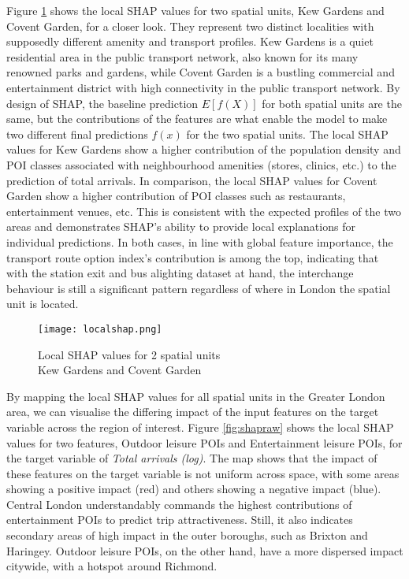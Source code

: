 Figure \ref{fig:localshap} shows the local SHAP values for two spatial units, Kew Gardens and Covent Garden, for a closer look. They represent two distinct localities with supposedly different amenity and transport profiles. Kew Gardens is a quiet residential area in the public transport network, also known for its many renowned parks and gardens, while Covent Garden is a bustling commercial and entertainment district with high connectivity in the public transport network. By design of SHAP, the baseline prediction $E[f(X)]$ for both spatial units are the same, but the contributions of the features are what enable the model to make two different final predictions $f(x)$ for the two spatial units. The local SHAP values for Kew Gardens show a higher contribution of the population density and POI classes associated with neighbourhood amenities (stores, clinics, etc.) to the prediction of total arrivals. In comparison, the local SHAP values for Covent Garden show a higher contribution of POI classes such as restaurants, entertainment venues, etc. This is consistent with the expected profiles of the two areas and demonstrates SHAP's ability to provide local explanations for individual predictions. In both cases, in line with global feature importance, the transport route option index's contribution is among the top, indicating that with the station exit and bus alighting dataset at hand, the interchange behaviour is still a significant pattern regardless of where in London the spatial unit is located.

\begin{figure}[!ht]
    \centering
    \texttt{[image: localshap.png]}
    \captionsetup{justification=centering}
    \caption{Local SHAP values for 2 spatial units\\Kew Gardens and Covent Garden}
    \label{fig:localshap}
\end{figure}

By mapping the local SHAP values for all spatial units in the Greater London area, we can visualise the differing impact of the input features on the target variable across the region of interest. Figure \ref{fig:shapraw} shows the local SHAP values for two features, Outdoor leisure POIs and Entertainment leisure POIs, for the target variable of \textit{Total arrivals (log)}. The map shows that the impact of these features on the target variable is not uniform across space, with some areas showing a positive impact (red) and others showing a negative impact (blue). Central London understandably commands the highest contributions of entertainment POIs to predict trip attractiveness. Still, it also indicates secondary areas of high impact in the outer boroughs, such as Brixton and Haringey. Outdoor leisure POIs, on the other hand, have a more dispersed impact citywide, with a hotspot around Richmond. 

